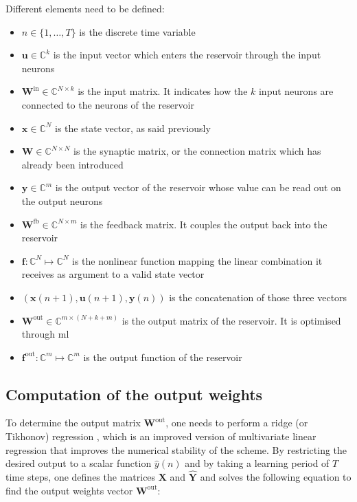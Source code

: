 Different elements need to be defined: 

\begin{itemize}
	\item $n \in \{1, \dots, T\}$ is the discrete time variable
	\item $\mathbf{u} \in \mathbb{C}^k$ is the input vector which enters the reservoir through the input neurons
	\item $\mathbf{W}^{\text{in}} \in \mathbb{C}^{N \times k}$ is the input matrix. It indicates how the $k$ input neurons are connected to the neurons of the reservoir
	\item $\mathbf{x} \in \mathbb{C}^{N}$ is the state vector, as said previously
	\item $\mathbf{W} \in \mathbb{C}^{N \times N}$ is the synaptic matrix, or the connection matrix which has already been introduced
	\item $\mathbf{y} \in \mathbb{C}^{m}$ is the output vector of the reservoir whose value can be read out on the output neurons
	\item $\mathbf{W}^{\text{fb}} \in \mathbb{C}^{N \times m}$ is the feedback matrix. It couples the output back into the reservoir
	\item $\mathbf{f}: \mathbb{C}^N \mapsto \mathbb{C}^N$ is the nonlinear function mapping the linear combination it receives as argument to a valid state vector
	\item $\left(\mathbf{x}(n+1), \mathbf{u}(n+1), \mathbf{y}(n)\right)$ is the concatenation of those three vectors
	\item $\mathbf{W}^{\text{out}} \in \mathbb{C}^{m \times (N+k+m)}$ is the output matrix of the reservoir. It is optimised through \gls{ml}
	\item $\mathbf{f}^{\text{out}} : \mathbb{C}^{m} \mapsto \mathbb{C}^{m}$ is the output function of the reservoir
\end{itemize}


\subsection{Computation of the output weights}

To determine the output matrix $\mathbf{W}^{\text{out}}$, one needs to perform a ridge (or Tikhonov) regression \cite{NIPS2010_4056}, which is an improved version of multivariate linear regression that improves the numerical stability of the scheme. By restricting the desired output to a scalar function $\hat{y}(n)$ and by taking a learning period of $T$ time steps, one defines the matrices $\mathbf{X}$ and $\hat{\mathbf{Y}}$ and solves the following equation to find the output weights vector $\mathbf{W}^{\text{out}}$:

